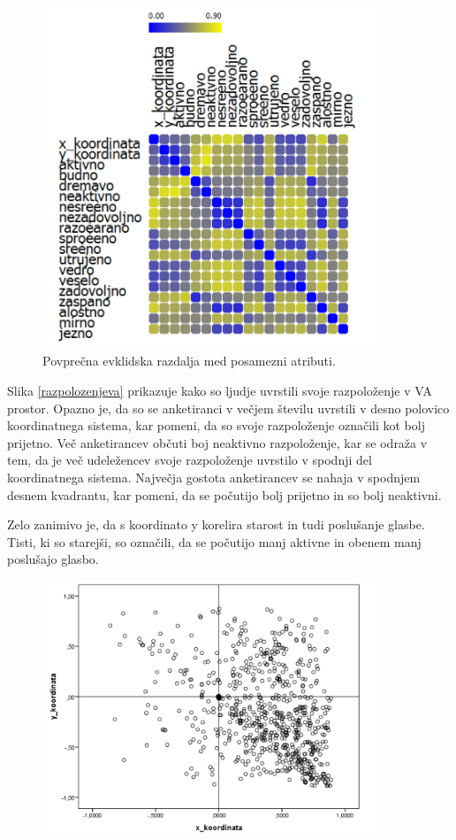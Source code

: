 \documentclass[a4paper, 12pt]{book}
\begin{document}
{\begin{figure}[hbt]
\centering
\includegraphics[width=10cm]{images/korelacija_custva_pris.png}

\caption{Povprečna evklidska razdalja med posamezni atributi.  }
\label{prisotnost_kor}
\end{figure}

Slika \ref{razpolozenjeva} prikazuje kako so ljudje uvrstili svoje razpoloženje v VA prostor. Opazno je, da so se anketiranci v večjem številu uvrstili v desno polovico koordinatnega sistema, kar pomeni, da so svoje razpoloženje označili kot bolj prijetno. Več anketirancev občuti boj neaktivno razpoloženje, kar se odraža v tem, da je več udeležencev svoje razpoloženje uvrstilo v spodnji del koordinatnega sistema. Največja gostota anketirancev se nahaja v spodnjem desnem kvadrantu, kar pomeni, da se počutijo bolj prijetno in so bolj neaktivni. 

Zelo zanimivo je, da s koordinato y korelira starost in tudi poslušanje glasbe. Tisti, ki so starejši, so označili, da se počutijo manj aktivne in obenem manj poslušajo glasbo. 

\begin{figure}[hbt]
\centering
\includegraphics[width=10cm]{images/vamood.png}


\end{figure}}
\end{document}
